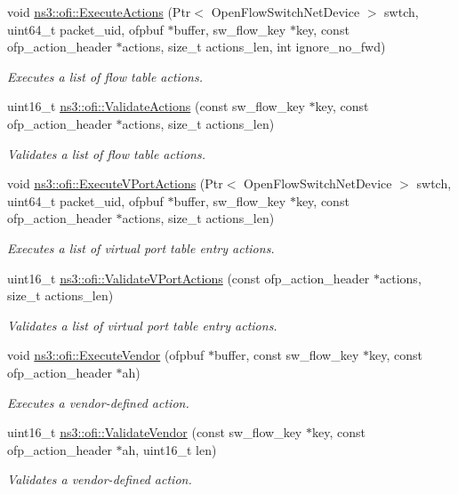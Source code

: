 \begin{DoxyCompactItemize}
\item 
void \hyperlink{namespacens3_1_1ofi_a41439bdca06b08c85c61f73cd4225d6c}{ns3\+::ofi\+::\+Execute\+Actions} (Ptr$<$ Open\+Flow\+Switch\+Net\+Device $>$ swtch, uint64\+\_\+t packet\+\_\+uid, ofpbuf $\ast$buffer, sw\+\_\+flow\+\_\+key $\ast$key, const ofp\+\_\+action\+\_\+header $\ast$actions, size\+\_\+t actions\+\_\+len, int ignore\+\_\+no\+\_\+fwd)
\begin{DoxyCompactList}\small\item\em Executes a list of flow table actions. \end{DoxyCompactList}\item 
uint16\+\_\+t \hyperlink{namespacens3_1_1ofi_a9a5a84fb06a171d0fd05b16db9c41fa6}{ns3\+::ofi\+::\+Validate\+Actions} (const sw\+\_\+flow\+\_\+key $\ast$key, const ofp\+\_\+action\+\_\+header $\ast$actions, size\+\_\+t actions\+\_\+len)
\begin{DoxyCompactList}\small\item\em Validates a list of flow table actions. \end{DoxyCompactList}\item 
void \hyperlink{namespacens3_1_1ofi_a1999c96e0e95bf97f38d42354e32a372}{ns3\+::ofi\+::\+Execute\+V\+Port\+Actions} (Ptr$<$ Open\+Flow\+Switch\+Net\+Device $>$ swtch, uint64\+\_\+t packet\+\_\+uid, ofpbuf $\ast$buffer, sw\+\_\+flow\+\_\+key $\ast$key, const ofp\+\_\+action\+\_\+header $\ast$actions, size\+\_\+t actions\+\_\+len)
\begin{DoxyCompactList}\small\item\em Executes a list of virtual port table entry actions. \end{DoxyCompactList}\item 
uint16\+\_\+t \hyperlink{namespacens3_1_1ofi_afbc3596d5a0e9ab90dcf847634a892d3}{ns3\+::ofi\+::\+Validate\+V\+Port\+Actions} (const ofp\+\_\+action\+\_\+header $\ast$actions, size\+\_\+t actions\+\_\+len)
\begin{DoxyCompactList}\small\item\em Validates a list of virtual port table entry actions. \end{DoxyCompactList}\item 
void \hyperlink{namespacens3_1_1ofi_a753e0d0eb199cfc070d5bdbdaa05a5c5}{ns3\+::ofi\+::\+Execute\+Vendor} (ofpbuf $\ast$buffer, const sw\+\_\+flow\+\_\+key $\ast$key, const ofp\+\_\+action\+\_\+header $\ast$ah)
\begin{DoxyCompactList}\small\item\em Executes a vendor-\/defined action. \end{DoxyCompactList}\item 
uint16\+\_\+t \hyperlink{namespacens3_1_1ofi_a6661189048b3d19d7753e01bd90c0442}{ns3\+::ofi\+::\+Validate\+Vendor} (const sw\+\_\+flow\+\_\+key $\ast$key, const ofp\+\_\+action\+\_\+header $\ast$ah, uint16\+\_\+t len)
\begin{DoxyCompactList}\small\item\em Validates a vendor-\/defined action. \end{DoxyCompactList}\end{DoxyCompactItemize}


